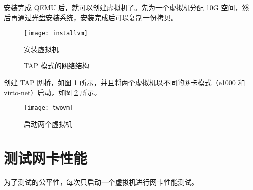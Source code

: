     安装完成 QEMU 后，就可以创建虚拟机了。先为一个虚拟机分配 10G 空间，然后再通过光盘安装系统，安装完成后可以复制一份拷贝。

    \begin{figure}[h]
        \centering
        \begin{minipage}{0.48\textwidth}
            \centering
            \texttt{[image: installvm]}
            \caption{安装虚拟机}\label{fig:installvm}
        \end{minipage}
        \begin{minipage}{0.48\textwidth}
            \centering
            
            \caption{TAP 模式的网络结构}\label{fig:tapnet}
        \end{minipage}
    \end{figure}


    创建 TAP 网桥\cite{tap}，如图 \ref{fig:tapnet} 所示，并且将两个虚拟机以不同的网卡模式（e1000 和 virto-net）启动，如图 \ref{fig:twovm} 所示。

    \begin{figure}[H]
        \centering
        \texttt{[image: twovm]}
        \caption{启动两个虚拟机}\label{fig:twovm}
    \end{figure}


    \section{测试网卡性能}

    为了测试的公平性，每次只启动一个虚拟机进行网卡性能测试。
    


    
